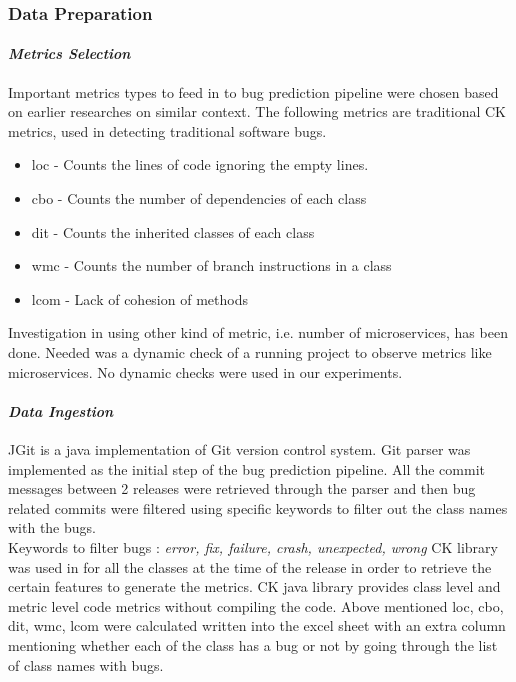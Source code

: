 \documentclass{seal_article}
\begin{document}
\subsubsection{Data Preparation}
\paragraph{\textit{Metrics Selection}}
Important metrics types to feed in to bug prediction pipeline were chosen based on earlier researches on similar context. The following metrics are traditional CK metrics, used in detecting traditional software bugs. \cite{ck}

\begin{itemize}
\item loc - Counts the lines of code ignoring the empty lines.
\item cbo - Counts the number of dependencies of each class 
\item dit -  Counts the inherited classes of each class
\item wmc - Counts the number of branch instructions in a class
\item lcom - Lack of cohesion of methods
\end{itemize}

Investigation in using other kind of metric, i.e. number of microservices, has been done. Needed was a dynamic check of a running project to observe metrics like microservices. No dynamic checks were used in our experiments.

\paragraph{\textit{Data Ingestion}}
JGit is a java implementation of Git version control system. Git parser was implemented as the initial step of the bug prediction pipeline. All the commit messages between 2 releases were retrieved through the parser and then bug related commits were filtered using specific keywords to filter out the class names with the bugs.
\\Keywords to filter bugs : 
\textit{error, fix, failure, crash, unexpected, wrong}
\vspace{\baselineskip}
\textsc{CK} \cite{ck} library was used in for all the classes at the time of the release in order to retrieve the certain features to generate the metrics. CK java library provides class level and metric level code metrics without compiling the code. Above mentioned loc, cbo, dit, wmc, lcom were calculated written into the excel sheet with an extra column mentioning whether each of the class has a bug or not by going through the list of class names with bugs.
\end{document}
